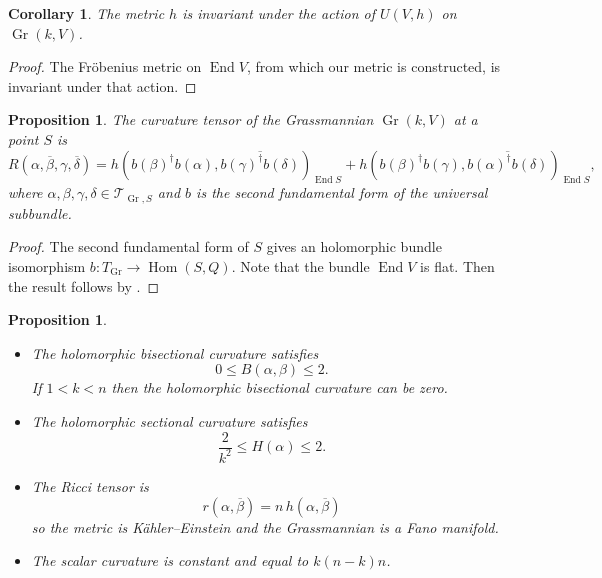 \documentclass[10pt,a4paper]{article}
\newtheorem{prop}[theo]{Proposition}
\newtheorem{coro}[theo]{Corollary}
\newtheorem*{proof}{Proof}
\newcommand{\cc}[1]{\mathcal{#1}}
\def\ov#1{\overline{#1}}
\DeclareMathOperator{\Gr}{Gr}
\DeclareMathOperator{\End}{End}
\DeclareMathOperator{\Hom}{Hom}
\begin{document}
\begin{coro}
The metric $h$ is invariant under the action of $U(V,h)$ on $\Gr(k,V)$.
\end{coro}

\begin{proof}
The Fr\"obenius metric on $\End V$, from which our metric is constructed, is invariant under that action.
\end{proof}


\begin{prop}
The curvature tensor of the Grassmannian $\Gr(k,V)$ at a point $S$ is
\[
R(\alpha,\ov\beta,\gamma,\ov\delta)
= h(b(\beta)^\dagger b(\alpha), \ov{b(\gamma)^\dagger b(\delta)})_{\End S}
+ h(b(\beta)^\dagger b(\gamma), \ov{b(\alpha)^\dagger b(\delta)})_{\End S},
\]
where $\alpha,\beta,\gamma,\delta \in \cc T_{\Gr,S}$ and $b$ is the second fundamental form of the universal subbundle.
\end{prop}


\begin{proof}
The second fundamental form of $S$ gives an holomorphic bundle isomorphism $b : T_{\Gr} \to \Hom(S, Q)$. Note that the bundle $\End V$ is flat. Then the result follows by .
\end{proof}



\begin{prop}
\begin{itemize}
\item
The holomorphic bisectional curvature satisfies
\[
0 \leq B(\alpha,\beta)
\leq 2.
\]
If $1 < k < n$ then the holomorphic bisectional curvature can be zero.
\item
The holomorphic sectional curvature satisfies
\[
\frac{2}{k^2} \leq H(\alpha) \leq 2.
\]
\item
The Ricci tensor is
\[
r(\alpha,\ov\beta) = n \, h(\alpha,\ov\beta)
\]
so the metric is K\"ahler--Einstein and the Grassmannian is a Fano manifold.
\item
The scalar curvature is constant and equal to $k (n-k) n$.
\end{itemize}
\end{prop}
\end{document}
